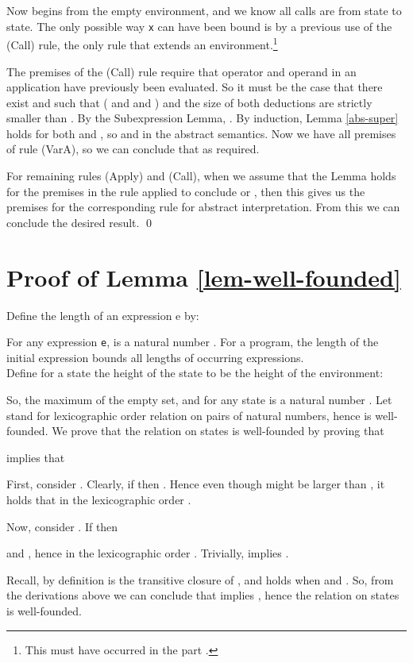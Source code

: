 \documentclass{LMCS}
\newcommand{\fl}{\noindent}
\newcommand{\bprf}{\proof}
\newcommand{\eprf}{\qed}
\theoremstyle{definition}\newtheorem{env}[thm]{Environment}
\begin{document}
Now  begins from 
the empty environment, and we know all calls are from state to state.
The only possible way {\tt x} can have been bound is 
by a previous use of the (Call) rule, 
the only rule that extends an environment.\footnote{This must have occurred in the part
.}

The premises of the (Call) rule require that 
operator and operand in an application  have previously been evaluated. So it must be the case that there exist  and  such that 
( and 
 and 
) and the size of both deductions are strictly smaller than . 
By the Subexpression Lemma, . 
By induction, 
Lemma \ref{abs-super} holds for both  and 
, so  and 
 in the abstract semantics. 
Now we have all premises of rule (VarA),
so we can conclude that  as required.

For remaining rules (Apply) and (Call), when we assume that the Lemma holds for the premises in 
the rule applied to conclude  or , 
then this gives us the premises for the corresponding rule for abstract interpretation. 
From this we can conclude the desired result.
\eprf

\section{Proof of Lemma \ref{lem-well-founded}}

\bprf
Define the length  of an expression e by:

For any expression {\tt e},  is a natural number .  For a program, the length of the initial expression bounds all lengths of occurring expressions.\\

\fl
Define for a state  the height  of the state to be the height of the environment:

So,  the maximum of the empty set, and for any state  is a natural number .
Let  stand for lexicographic order relation on pairs of natural numbers,
hence  is well-founded.
We prove that the relation  on states is well-founded
by proving that

implies
that


First, consider . Clearly, if   then
. 
Hence even though  might be  larger than , 
it holds that in the lexicographic order  
.

Now, consider . If  then

and , hence
in the lexicographic order
.
Trivially,  implies
.

Recall, by definition  is the transitive closure 
of , and  
holds when  and .
So, from the derivations above we can conclude that
 implies
,
hence the relation  on states is well-founded.
\end{document}
